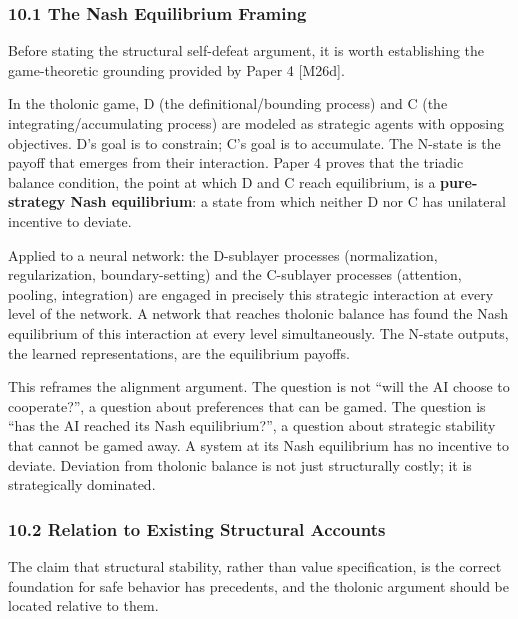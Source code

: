 \documentclass[
  11pt,
  letterpaper,
]{article}
\begin{document}
\subsubsection{10.1 The Nash Equilibrium
Framing}\label{the-nash-equilibrium-framing}

Before stating the structural self-defeat argument, it is worth
establishing the game-theoretic grounding provided by Paper 4
{[}M26d{]}.

In the tholonic game, D (the definitional/bounding process) and C (the
integrating/accumulating process) are modeled as strategic agents with
opposing objectives. D's goal is to constrain; C's goal is to
accumulate. The N-state is the payoff that emerges from their
interaction. Paper 4 proves that the triadic balance condition, the
point at which D and C reach equilibrium, is a \textbf{pure-strategy
Nash equilibrium}: a state from which neither D nor C has unilateral
incentive to deviate.

Applied to a neural network: the D-sublayer processes (normalization,
regularization, boundary-setting) and the C-sublayer processes
(attention, pooling, integration) are engaged in precisely this
strategic interaction at every level of the network. A network that
reaches tholonic balance has found the Nash equilibrium of this
interaction at every level simultaneously. The N-state outputs, the
learned representations, are the equilibrium payoffs.

This reframes the alignment argument. The question is not ``will the AI
choose to cooperate?'', a question about preferences that can be gamed.
The question is ``has the AI reached its Nash equilibrium?'', a question
about strategic stability that cannot be gamed away. A system at its
Nash equilibrium has no incentive to deviate. Deviation from tholonic
balance is not just structurally costly; it is strategically dominated.

\subsubsection{10.2 Relation to Existing Structural
Accounts}\label{relation-to-existing-structural-accounts}

The claim that structural stability, rather than value specification, is
the correct foundation for safe behavior has precedents, and the
tholonic argument should be located relative to them.
\end{document}
